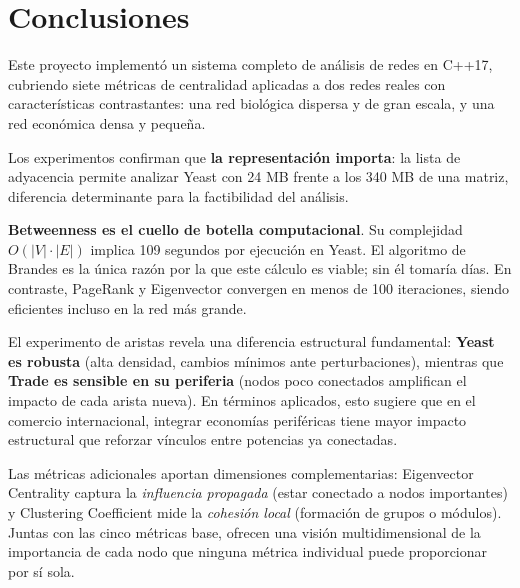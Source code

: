 \section{Conclusiones}

Este proyecto implementó un sistema completo de análisis de redes en C++17,
cubriendo siete métricas de centralidad aplicadas a dos redes reales con
características contrastantes: una red biológica dispersa y de gran escala,
y una red económica densa y pequeña.

Los experimentos confirman que \textbf{la representación importa}: la lista de
adyacencia permite analizar Yeast con 24 MB frente a los 340 MB de una matriz,
diferencia determinante para la factibilidad del análisis.

\textbf{Betweenness es el cuello de botella computacional}. Su complejidad
$O(|V|\cdot|E|)$ implica 109 segundos por ejecución en Yeast. El algoritmo de
Brandes es la única razón por la que este cálculo es viable; sin él tomaría días.
En contraste, PageRank y Eigenvector convergen en menos de 100 iteraciones,
siendo eficientes incluso en la red más grande.

El experimento de aristas revela una diferencia estructural fundamental:
\textbf{Yeast es robusta} (alta densidad, cambios mínimos ante perturbaciones),
mientras que \textbf{Trade es sensible en su periferia} (nodos poco conectados
amplifican el impacto de cada arista nueva). En términos aplicados, esto sugiere
que en el comercio internacional, integrar economías periféricas tiene mayor impacto
estructural que reforzar vínculos entre potencias ya conectadas.

Las métricas adicionales aportan dimensiones complementarias: Eigenvector Centrality
captura la \textit{influencia propagada} (estar conectado a nodos importantes) y
Clustering Coefficient mide la \textit{cohesión local} (formación de grupos o módulos).
Juntas con las cinco métricas base, ofrecen una visión multidimensional de la
importancia de cada nodo que ninguna métrica individual puede proporcionar por sí sola.
